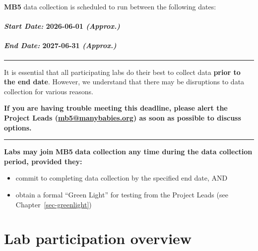 \documentclass[
  letterpaper,
  DIV=11,
  numbers=noendperiod,
  oneside]{scrreprt}
\providecommand{\tightlist}{%
  \setlength{\itemsep}{0pt}\setlength{\parskip}{0pt}}
\begin{document}
\textbf{MB5} data collection is scheduled to run between the following
dates:

\subsubsection*{\texorpdfstring{\emph{Start Date:} \textbf{2026-06-01}
\emph{(Approx.)}}{Start Date: 2026-06-01 (Approx.)}}\label{start-date-2026-06-01-approx.}

\subsubsection*{\texorpdfstring{\emph{End Date:} \textbf{2027-06-31}
\emph{(Approx.)}}{End Date: 2027-06-31 (Approx.)}}\label{end-date-2027-06-31-approx.}

\begin{center}\rule{0.5\linewidth}{0.5pt}\end{center}

It is essential that all participating labs do their best to collect
data \textbf{prior to the end date}. However, we understand that there
may be disruptions to data collection for various reasons.

\textbf{If you are having trouble meeting this deadline, please alert
the Project Leads
(}\href{mailto:mb5@manybabies.org}{\textbf{mb5@manybabies.org}}\textbf{)
as soon as possible to discuss options.}

\begin{center}\rule{0.5\linewidth}{0.5pt}\end{center}

\textbf{Labs may join} \textbf{MB5} \textbf{data collection any time
during the data collection period, provided they:}

\begin{itemize}
\tightlist
\item
  commit to completing data collection by the specified end date, AND
\item
  obtain a formal ``Green Light'' for testing from the Project Leads
  (see Chapter~\ref{sec-greenlight})
\end{itemize}

\chapter{Lab participation overview}\label{sec-laboverview}
\end{document}
